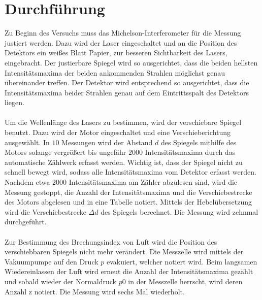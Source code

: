 \section{Durchführung}
\label{sec:Durchführung}
Zu Beginn des Versuchs muss das Michelson-Interferometer für die Messung justiert werden. 
Dazu wird der Laser eingeschaltet und an die Position des Detektors ein weißes Blatt Papier, zur besseren Sichtbarkeit des Lasers, eingebracht.
Der justierbare Spiegel wird so ausgerichtet, dass die beiden hellsten Intensitätsmaxima
der beiden ankommenden Strahlen möglichst genau übereinander treffen. 
Der Detektor wird entsprechend so ausgerichtet, dass die Intensitätsmaxima beider
Strahlen genau auf dem Eintrittsspalt des Detektors liegen.\\
\\
Um die Wellenlänge des Lasers zu bestimmen, wird der verschiebare Spiegel benutzt. Dazu wird der Motor eingeschaltet und eine Verschieberichtung
ausgewählt.
In $10$ Messungen wird der Abstand $d$ des Spiegels mithilfe des Motors solange vergrößert bis ungefähr $2000$ Intensitätsmaxima durch das automatische
Zählwerk erfasst werden.
Wichtig ist, dass der Spiegel nicht zu schnell bewegt wird, sodass alle Intensitätsmaxima vom Detektor erfasst werden.
Nachdem etwa 2000 Intensitätsmaxima am Zähler abzulesen sind, wird die Messung gestoppt, die Anzahl der Intensitätsmaxima und die Verschiebestrecke 
des Motors abgelesen und in eine Tabelle notiert.
Mittels der Hebelübersetzung wird die Verschiebestrecke $\Delta d$ des Spiegels berechnet.
Die Messung wird zehnmal durchgeführt.\\
\\

Zur Bestimmung des Brechungsindex von Luft wird die Position des verschiebbaren Spiegels nicht
mehr verändert.
Die Messzelle wird mittels der Vakuumpumpe auf den Druck $p$ evakuiert, welcher notiert
wird. Beim langsamen Wiedereinlassen der Luft wird erneut die Anzahl der Intensitätsmaxima gezählt
und sobald wieder der Normaldruck $p0$ in der Messzelle herrscht, wird deren Anzahl z notiert.
Die Messung wird sechs Mal wiederholt.
